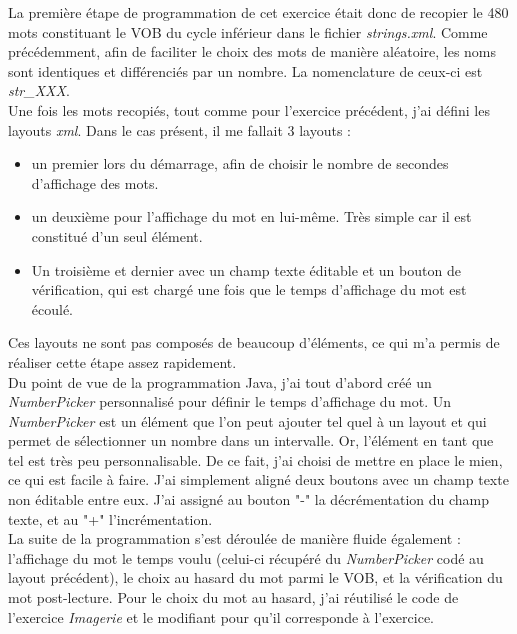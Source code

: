 La première étape de programmation de cet exercice était donc de recopier le 480 mots constituant le VOB du cycle inférieur dans le fichier \textit{strings.xml}. Comme précédemment, afin de faciliter le choix des mots de manière aléatoire, les noms sont identiques et différenciés par un nombre. La nomenclature de ceux-ci est \textit{str\_XXX}. \\

Une fois les mots recopiés, tout comme pour l'exercice précédent, j'ai défini les layouts \textit{xml}. Dans le cas présent, il me fallait 3 layouts :
\begin{itemize}
\item un premier lors du démarrage, afin de choisir le nombre de secondes d'affichage des mots.
\item un deuxième pour l'affichage du mot en lui-même. Très simple car il est constitué d'un seul élément.
\item Un troisième et dernier avec un champ texte éditable et un bouton de vérification, qui est chargé une fois que le temps d'affichage du mot est écoulé.
\end{itemize}
Ces layouts ne sont pas composés de beaucoup d'éléments, ce qui m'a permis de réaliser cette étape assez rapidement.\\

Du point de vue de la programmation Java, j'ai tout d'abord créé un \textit{NumberPicker} personnalisé pour définir le temps d'affichage du mot. Un \textit{NumberPicker} est un élément que l'on peut ajouter tel quel à un layout et qui permet de sélectionner un nombre dans un intervalle. Or, l'élément en tant que tel est très peu personnalisable. De ce fait, j'ai choisi de mettre en place le mien, ce qui est facile à faire. J'ai simplement aligné deux boutons avec un champ texte non éditable entre eux. J'ai assigné au bouton "-" la décrémentation du champ texte, et au "+" l'incrémentation.\\

La suite de la programmation s'est déroulée de manière fluide également : l'affichage du mot le temps voulu (celui-ci récupéré du \textit{NumberPicker} codé au layout précédent), le choix au hasard du mot parmi le VOB, et la vérification du mot post-lecture. Pour le choix du mot au hasard, j'ai réutilisé le code de l'exercice \textit{Imagerie} et le modifiant pour qu'il corresponde à l'exercice.\\

